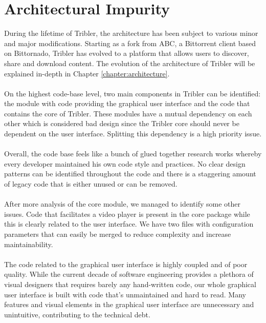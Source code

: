 \section{Architectural Impurity}
During the lifetime of Tribler, the architecture has been subject to various minor and major modifications. Starting as a fork from ABC, a Bittorrent client based on Bittornado, Tribler has evolved to a platform that allows users to discover, share and download content. The evolution of the architecture of Tribler will be explained in-depth in Chapter \ref{chapter:architecture}.\\\\
On the highest code-base level, two main components in Tribler can be identified: the module with code providing the graphical user interface and the code that contains the core of Tribler. These modules have a mutual dependency on each other which is considered bad design since the Tribler core should never be dependent on the user interface. Splitting this dependency is a high priority issue.\\\\
Overall, the code base feels like a bunch of glued together research works whereby every developer maintained his own code style and practices. No clear design patterns can be identified throughout the code and there is a staggering amount of legacy code that is either unused or can be removed.\\\\
After more analysis of the core module, we managed to identify some other issues. Code that facilitates a video player is present in the core package while this is clearly related to the user interface. We have two files with configuration parameters that can easily be merged to reduce complexity and increase maintainability.\\\\
The code related to the graphical user interface is highly coupled and of poor quality. While the current decade of software engineering provides a plethora of visual designers that requires barely any hand-written code, our whole graphical user interface is built with code that's unmaintained and hard to read. Many features and visual elements in the graphical user interface are unnecessary and unintuitive, contributing to the technical debt.


